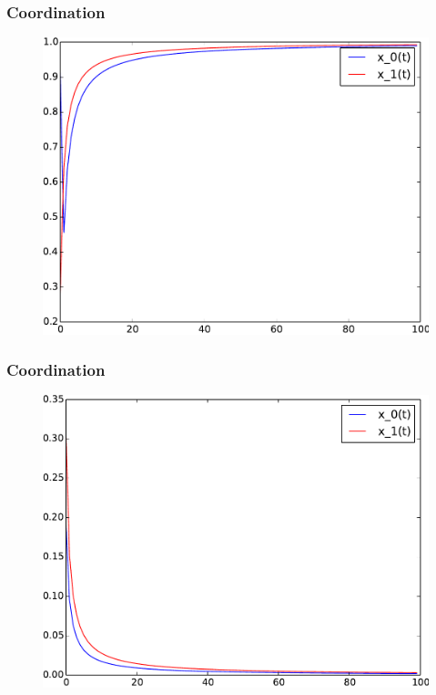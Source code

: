 \documentclass[dvipdfmx,fleqn,handout]{beamer}
\begin{document}
\begin{frame}
\frametitle{Coordination}
\begin{figure}
 \centering
 \includegraphics[width=\linewidth]{coordplay0.pdf}
 \label{fig:coordination}
\end{figure}
\end{frame}


\begin{frame}
\frametitle{Coordination}
\begin{figure}
 \centering
 \includegraphics[width=\linewidth]{coordplay1.pdf}
 \label{fig:coordination}
\end{figure}
\end{frame}
\end{document}
